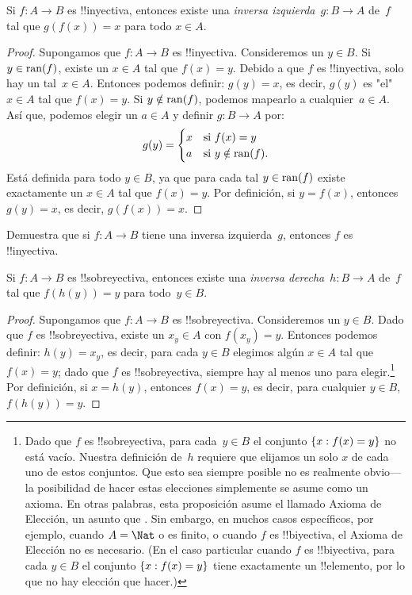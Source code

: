 \documentclass[../../../include/open-logic-section]{subfiles}
\begin{document}
\begin{prop}
Si $f\colon A \to B$ es !!{inyectiva}, entonces existe una \emph{inversa izquierda}~$g\colon B \to A$ de~$f$ tal que $g(f(x)) = x$ para todo $x \in A$.
\end{prop}

\begin{proof}
Supongamos que $f\colon A \to B$ es !!{inyectiva}. Consideremos un $y \in B$.
Si $y \in \mathrm{ran}(f)$, existe un $x \in A$ tal que $f(x) = y$. Debido a que $f$ es !!{inyectiva}, solo hay un tal~$x \in A$. Entonces podemos definir: $g(y) = x$, es decir, $g(y)$ es "el" $x \in A$ tal que $f(x) = y$. Si $y \notin \mathrm{ran}(f)$, podemos mapearlo a cualquier~$a \in A$. Así que, podemos elegir un $a \in A$ y definir $g\colon B \to A$ por:
\[
g(y) = \begin{cases}
  x & \text{si $f(x) = y$}\\
  a & \text{si $y \notin \mathrm{ran}(f)$.}
\end{cases}
\]
Está definida para todo $y \in B$, ya que para cada tal $y \in \mathrm{ran}(f)$
existe exactamente un $x \in A$ tal que $f(x) = y$. Por definición, si
$y = f(x)$, entonces $g(y) = x$, es decir, $g(f(x)) = x$.
\end{proof}

\begin{prob}
Demuestra que si $f\colon A \to B$ tiene una inversa izquierda~$g$, entonces $f$ es !!{inyectiva}.
\end{prob}

\begin{prop}
Si $f\colon A \to B$ es !!{sobreyectiva}, entonces existe una \emph{inversa derecha}~$h\colon B \to A$ de~$f$ tal que $f(h(y)) = y$ para todo~$y \in B$.
\end{prop}

\begin{proof}
Supongamos que $f\colon A \to B$ es !!{sobreyectiva}. Consideremos un $y \in B$. Dado que $f$ es !!{sobreyectiva}, existe un $x_y \in A$ con $f(x_y) = y$. Entonces podemos definir: $h(y) = x_y$, es decir, para cada $y \in B$ elegimos algún $x \in A$ tal que $f(x) = y$; dado que $f$ es !!{sobreyectiva}, siempre hay al menos uno para elegir.\footnote{Dado que $f$ es !!{sobreyectiva}, para cada~$y \in B$ el conjunto $\{ x : f(x) = y \}$ no está vacío. Nuestra definición de~$h$ requiere que elijamos un solo $x$ de cada uno de estos conjuntos. Que esto sea siempre posible no es realmente obvio---la posibilidad de hacer estas elecciones simplemente se asume como un axioma. En otras palabras, esta proposición asume el llamado Axioma de Elección, un asunto que . Sin embargo, en muchos casos específicos, por ejemplo, cuando $A = \Nat$ o es finito, o cuando $f$ es !!{biyectiva}, el Axioma de Elección no es necesario. (En el caso particular cuando $f$ es !!{biyectiva}, para cada $y \in B$ el conjunto $\{ x : f(x) = y \}$ tiene exactamente un !!{elemento}, por lo que no hay elección que hacer.)} Por definición, si $x = h(y)$, entonces $f(x) = y$, es decir, para cualquier $y \in B$, $f(h(y)) = y$.
\end{proof}
\end{document}
